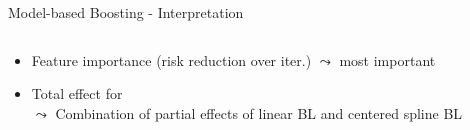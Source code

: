 \documentclass[11pt,compress,t,notes=noshow, aspectratio=169, xcolor=table]{beamer}
\begin{document}
\begin{frame}{Model-based Boosting - Interpretation}
\begin{columns}[T]
{\begin{column}{0.5\textwidth}
\end{column}
}
\end{columns}
\begin{itemize}
    \item<2->  Feature importance (risk reduction over iter.) $\leadsto$  most important
     \item<3-> Total effect for \\
$\leadsto$ Combination of partial effects of linear BL and centered spline BL
\end{itemize}
\end{frame}


\endlecture
\end{document}
